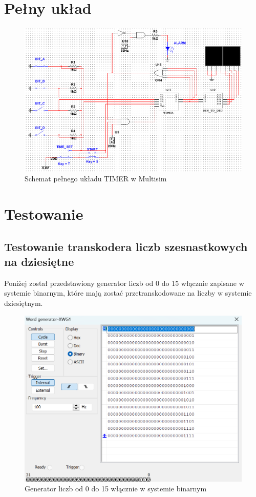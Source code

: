\documentclass{article}
\begin{document}
    \section{Pełny układ}
    \begin{figure}[H]
        \centering
        \captionsetup{font=small, skip=2pt}
        \includegraphics[scale=0.7]{images/pelny_timer}
        \caption{Schemat pełnego układu TIMER w Multisim}
    \end{figure}

    \section{Testowanie}

    \subsection{Testowanie transkodera liczb szesnastkowych na dziesiętne}
    Poniżej został przedstawiony generator liczb od 0 do 15 włącznie zapisane w systemie binarnym,
    które mają zostać przetranskodowane na liczby w systemie dziesiętnym.
    \begin{figure}[H]
        \centering
        \captionsetup{font=small, skip=2pt}
        \includegraphics[scale=0.7]{images/generator1}
        \caption{Generator liczb od 0 do 15 włącznie w systemie binarnym}
    \end{figure}
    
\end{document}
